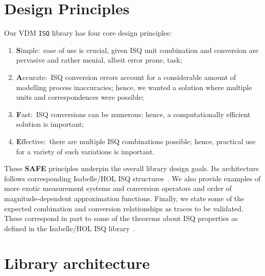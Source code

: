 \documentclass[runningheads,a4paper]{llncs}
\begin{document}

\section{Design Principles}\label{sec:principles}

Our VDM \texttt{ISQ} library has four core design principles:

	\begin{enumerate}
		\item \textbf{S}imple:~ease of use is crucial, given ISQ unit combination and conversion are pervasive and rather menial, albeit error prone, task;
		 
		\item \textbf{A}ccurate:~ISQ conversion errors account for a considerable amount of modelling process inaccuracies; hence, we wanted a solution where multiple units and correspondences were possible;
		 
		\item \textbf{F}ast:~ISQ conversions can be numerous; hence, a computationally efficient solution is important;
		 
		\item \textbf{E}ffective:~there are multiple ISQ combinations possible; hence, practical use for a variety of such variations is important.   
	\end{enumerate}
        
These \textbf{SAFE} principles underpin the overall library design goals. Its architecture follows corresponding Isabelle/HOL ISQ structures~\cite{Physical_Quantities-AFP}. We also provide examples of more exotic measurement systems and conversion operators and order of magnitude-dependent approximation functions. Finally, we state some of the expected combination and conversion relationships as traces to be validated. These correspond in part to some of the theorems about ISQ properties as defined in the Isabelle/HOL ISQ library~\cite{Physical_Quantities-AFP}.   

\section{Library architecture}\label{sec:architecture}
\end{document}
